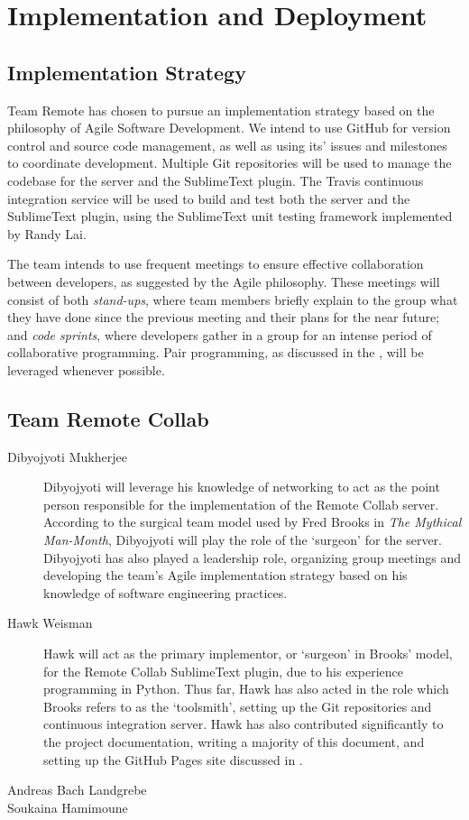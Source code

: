 \documentclass[11pt,english]{article}
\begin{document}
\section{Implementation and Deployment}
	\subsection{Implementation Strategy}
		Team Remote has chosen to pursue an implementation strategy based on the philosophy of Agile Software Development. We intend to use GitHub\cite{github} for version control and source code management, as well as using its' issues and milestones to coordinate development. Multiple Git repositories will be used to manage the codebase for the server and the SublimeText plugin. The Travis continuous integration service\cite{travis-ci} will be used to build and test both the server and the SublimeText plugin, using the SublimeText unit testing framework\cite{unittest} implemented by Randy Lai.

		The team intends to use frequent meetings to ensure effective collaboration between developers, as suggested by the Agile philosophy. These meetings will consist of both \textit{stand-ups}, where team members briefly explain to the group what they have done since the previous meeting and their plans for the near future; and \textit{code sprints}, where developers gather in a group for an intense period of collaborative programming. Pair programming, as discussed in the , will be leveraged whenever possible.
	\subsection{Team Remote Collab}
		\begin{description}
			\item[Dibyojyoti Mukherjee]{Dibyojyoti will leverage his knowledge of networking to act as the point person responsible for the implementation of the Remote Collab server. According to the surgical team model used by Fred Brooks in \textit{The Mythical Man-Month}\cite{mythical}, Dibyojyoti will play the role of the `surgeon' for the server. Dibyojyoti has also played a leadership role, organizing group meetings and developing the team's Agile implementation strategy based on his knowledge of software engineering practices.}
			\item[Hawk Weisman]{Hawk will act as the primary implementor, or `surgeon' in Brooks' model\cite{mythical}, for the Remote Collab SublimeText plugin, due to his experience programming in Python. Thus far, Hawk has also acted in the role which Brooks refers to as the `toolsmith'\cite{mythical}, setting up the Git repositories and continuous integration server. Hawk has also contributed significantly to the project documentation, writing a majority of this document, and setting up the GitHub Pages site discussed in .}
			\item[Andreas Bach Landgrebe]{}
			\item[Soukaina Hamimoune]{}
		\end{description}
\end{document}

